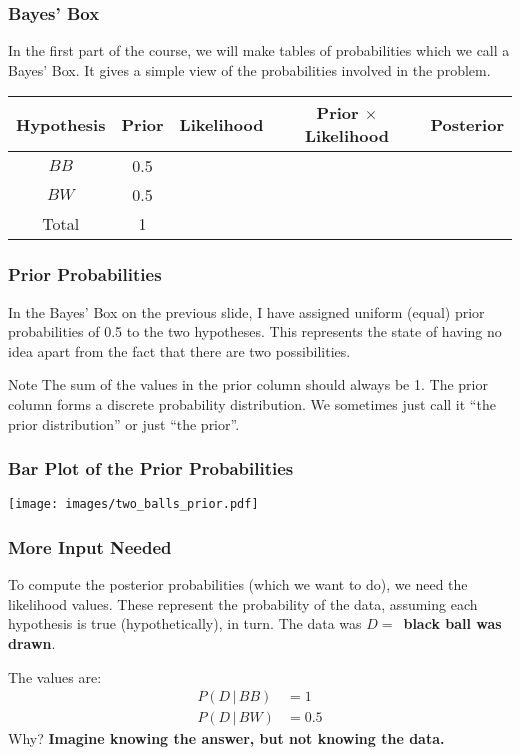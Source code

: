 \documentclass{beamer}
\newcommand{\given}{\,|\,}
\begin{document}
\begin{frame}
\frametitle{Bayes' Box}
In the first part of the course, we will make tables of probabilities
which we call a Bayes' Box. It gives a simple view of the probabilities
involved in the problem.\\[0.5em]\pause

\begin{tabular}{|c|c|c|c|c|}
\hline
Hypothesis & Prior & Likelihood & Prior $\times$ Likelihood & Posterior \\
\hline
$BB$ & 0.5 & & & \\
$BW$ & 0.5 & & & \\
\hline
Total & 1 & & & \\
\hline
\end{tabular}

\end{frame}


\begin{frame}
\frametitle{Prior Probabilities}
In the Bayes' Box on the previous slide, I have assigned uniform (equal)
prior probabilities of 0.5 to the two hypotheses. This represents the state
of having no idea apart from the fact that there are two possibilities.\pause

\begin{alertblock}{Note}
The sum of the values in the prior column should always be 1.
The prior column forms a discrete probability distribution.
We sometimes just call it ``the prior distribution'' or just ``the prior''.
\end{alertblock}


\end{frame}



\begin{frame}
\frametitle{Bar Plot of the Prior Probabilities}

\centering
\texttt{[image: images/two\_balls\_prior.pdf]}

\end{frame}



\begin{frame}
\frametitle{More Input Needed}
To compute the posterior probabilities (which we want to do), we need
the likelihood values. These represent the probability of the data, assuming
each hypothesis is true (hypothetically), in turn. The data was
$D = $~{\bf black ball was drawn}.\pause

The values are:
\begin{align}
P(D \given BB) &= 1 \\
P(D \given BW) &= 0.5
\end{align}
Why? {\bf Imagine knowing the answer, but not knowing the data.}

\end{frame}
\end{document}
